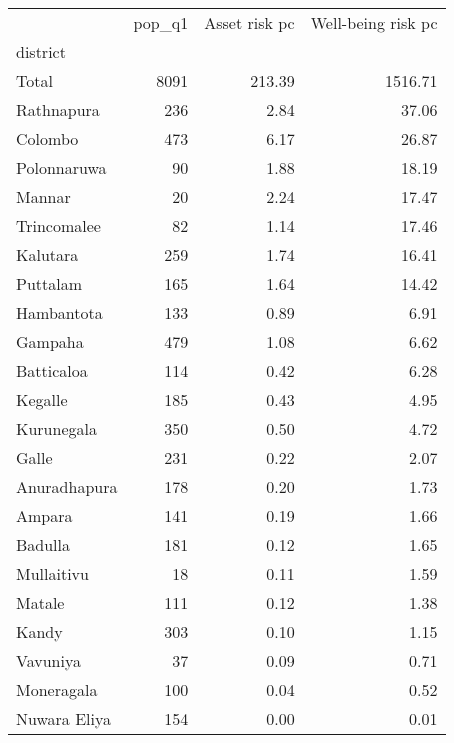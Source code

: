 \begin{tabular}{lrrr}
\toprule
{} &  pop\_q1 &  Asset risk pc &  Well-being risk pc \\
district     &         &                &                     \\
\midrule
Total        &    8091 &         213.39 &             1516.71 \\
Rathnapura   &     236 &           2.84 &               37.06 \\
Colombo      &     473 &           6.17 &               26.87 \\
Polonnaruwa  &      90 &           1.88 &               18.19 \\
Mannar       &      20 &           2.24 &               17.47 \\
Trincomalee  &      82 &           1.14 &               17.46 \\
Kalutara     &     259 &           1.74 &               16.41 \\
Puttalam     &     165 &           1.64 &               14.42 \\
Hambantota   &     133 &           0.89 &                6.91 \\
Gampaha      &     479 &           1.08 &                6.62 \\
Batticaloa   &     114 &           0.42 &                6.28 \\
Kegalle      &     185 &           0.43 &                4.95 \\
Kurunegala   &     350 &           0.50 &                4.72 \\
Galle        &     231 &           0.22 &                2.07 \\
Anuradhapura &     178 &           0.20 &                1.73 \\
Ampara       &     141 &           0.19 &                1.66 \\
Badulla      &     181 &           0.12 &                1.65 \\
Mullaitivu   &      18 &           0.11 &                1.59 \\
Matale       &     111 &           0.12 &                1.38 \\
Kandy        &     303 &           0.10 &                1.15 \\
Vavuniya     &      37 &           0.09 &                0.71 \\
Moneragala   &     100 &           0.04 &                0.52 \\
Nuwara Eliya &     154 &           0.00 &                0.01 \\
\bottomrule
\end{tabular}
